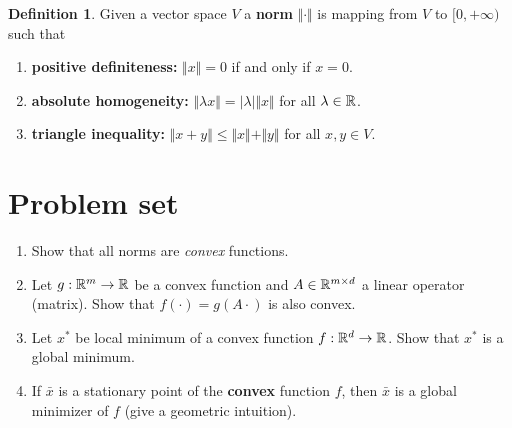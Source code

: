 \documentclass{scrartcl}
\theoremstyle{definition}
\newtheorem{definition}{Definition}[section]
\begin{document}
\begin{definition}
  Given a vector space $V$ a \textbf{norm} $\Vert \cdot \Vert$ is mapping from $V$ to $[0, +\infty)$ such that
  \begin{enumerate}
    \item \textbf{positive definiteness:} $\Vert x \Vert = 0$ if and only if $x=0$.
    \item \textbf{absolute homogeneity:} $\Vert \lambda x \Vert = \vert \lambda \vert \Vert x \Vert$ for all $\lambda \in \mathbb{R}$.
      \item \textbf{triangle inequality:} $\Vert x+y \Vert \le \Vert x \Vert + \Vert y \Vert$ for all $x,y \in V$.
  \end{enumerate}
\end{definition}

\section{Problem set}%

\begin{enumerate}
  \item Show that all norms are \emph{convex} functions.
  \item Let $g: \mathbb{R}^m \to \mathbb{R}$ be a convex function and $A \in \mathbb{R}^{m \times d}$ a linear operator (matrix). Show that $f(\cdot) = g(A \cdot)$ is also convex.
  \item Let $x^*$ be local minimum of a convex function $f:\mathbb{R}^d\to \mathbb{R}$. Show that $x^*$ is a global minimum.
  \item If $\bar{x}$ is a stationary point of the \textbf{convex} function $f$, then $\bar{x}$ is a global minimizer of $f$ (give a geometric intuition).
\end{enumerate}
\end{document}
